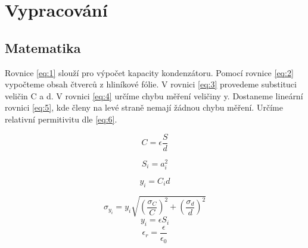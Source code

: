 					
			
		\section{Vypracování}
		\subsection{Matematika}
		Rovnice \eqref{eq:1} slouží pro výpočet kapacity kondenzátoru. Pomocí rovnice \eqref{eq:2} vypočteme obsah čtverců z hliníkové fólie.
		V rovnici \eqref{eq:3} provedeme substituci veličin C a d. V rovnici \eqref{eq:4} určíme chybu měření veličiny y. Dostaneme lineární rovnici \eqref{eq:5}, kde členy na levé straně nemají žádnou chybu měření. Určíme relativní permitivitu dle \eqref{eq:6}.
		
		\begin{equation}\label{eq:1}
			C = \epsilon \frac{S}{d}
		\end{equation}
		
		\begin{equation}\label{eq:2}
		S_i = a_i^2
		\end{equation}
		
		\begin{equation}\label{eq:3}
			y_i = C_i d
		\end{equation}
			
		
	\begin{equation}\label{eq:4}
	\sigma_{y_i} = y_i \sqrt{\left( \frac{\sigma_C}{C}\right) ^2 + \left( \frac{\sigma_d}{d}\right) ^2}
	\end{equation}	
\begin{equation}\label{eq:5}
	y_i = \epsilon S_i
\end{equation}
\begin{equation}\label{eq:6}
\epsilon_r = \frac{\epsilon}{\epsilon_0}
\end{equation}

		
